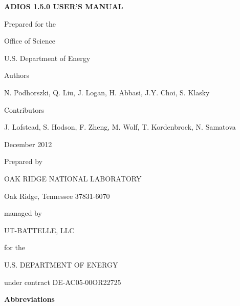 \begin{center}
{\Large \textbf{ADIOS 1.5.0 USER'S MANUAL}}

\vspace{60pt}
Prepared for the

Office of Science

U.S. Department of Energy

\vspace{60pt}
Authors

\vspace{6pt}
N. Podhorszki, Q. Liu, J. Logan, H. Abbasi, J.Y. Choi, S. Klasky

\vspace{30pt}
Contributors 

\vspace{6pt}
J. Lofstead, S. Hodson, F. Zheng, M. Wolf, T. Kordenbrock, N. Samatova

\vspace{72pt}
December 2012

\vspace{72pt}
Prepared by

OAK RIDGE NATIONAL LABORATORY

Oak Ridge, Tennessee 37831-6070

managed by

UT-BATTELLE, LLC

for the

U.S. DEPARTMENT OF ENERGY

under contract DE-AC05-00OR22725

\end{center}


\newpage

\tableofcontents


\newpage

\listoffigures


\newpage

\vspace{66pt}
\textbf{Abbreviations}


